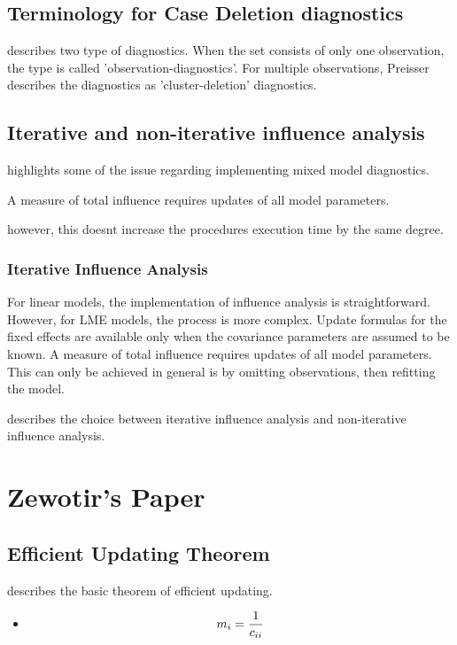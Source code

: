 \documentclass[main.tex]{subfiles}
\begin{document}
\newpage
\section{Terminology for Case Deletion diagnostics} %

\citet{preisser} describes two type of diagnostics. When the set consists of only one observation, the type is called
'observation-diagnostics'. For multiple observations, Preisser describes the diagnostics as 'cluster-deletion' diagnostics.


\newpage
\section{Iterative and non-iterative influence analysis} %
\citet{schabenberger} highlights some of the issue regarding implementing mixed model diagnostics.

A measure of total influence requires updates of all model parameters.

however, this doesnt increase the procedures execution time by the same degree.
\subsection{Iterative Influence Analysis}

For linear models, the implementation of influence analysis is straightforward.
However, for LME models, the process is more complex. Update formulas for the fixed effects are available only when the covariance parameters are assumed to be known. A measure of total influence requires updates of all model parameters.
This can only be achieved in general is by omitting observations, then refitting the model.

\citet{schabenberger} describes the choice between  iterative influence analysis and  non-iterative influence analysis.




\chapter{Zewotir's Paper}


\section{Efficient Updating Theorem} %
\citet{Zewotir} describes the basic theorem of efficient updating.
\begin{itemize}
	\item \[ m_i = {1 \over c_{ii}}\]
\end{itemize}
\end{document}
